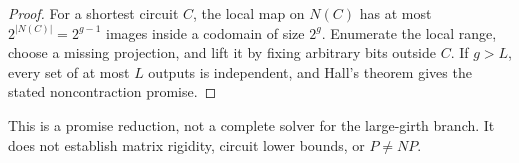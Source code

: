 \documentclass[11pt]{article}
\begin{document}
\begin{proof}
For a shortest circuit $C$, the local map on $N(C)$ has at most
$2^{|N(C)|}=2^{g-1}$ images inside a codomain of size $2^g$. Enumerate the
local range, choose a missing projection, and lift it by fixing arbitrary bits
outside $C$. If $g>L$, every set of at most $L$ outputs is independent, and
Hall's theorem gives the stated noncontraction promise.
\end{proof}

This is a promise reduction, not a complete solver for the large-girth branch.
It does not establish matrix rigidity, circuit lower bounds, or $P\neq NP$.
\end{document}
